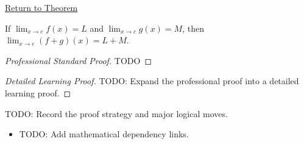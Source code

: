 \newpage
{}
\label{prf:sum-rule-function-limits}

\begin{remark*}[Return]
\hyperref[thm:sum-rule-function-limits]{Return to Theorem}
\end{remark*}

\begin{theorem*}
If $\lim_{x\to c}f(x)=L$ and $\lim_{x\to c}g(x)=M$, then $\lim_{x\to c}(f+g)(x)=L+M$.
\end{theorem*}

\begin{proof}[Professional Standard Proof]
\LRAProofBodyStart
TODO
\end{proof}

\begin{proof}[Detailed Learning Proof]
\LRAProofBodyStart
TODO: Expand the professional proof into a detailed learning proof.
\end{proof}

\begin{remark*}
TODO: Record the proof strategy and major logical moves.
\end{remark*}

\begin{dependencies}
\begin{itemize}
  \item TODO: Add mathematical dependency links.
\end{itemize}
\end{dependencies}
